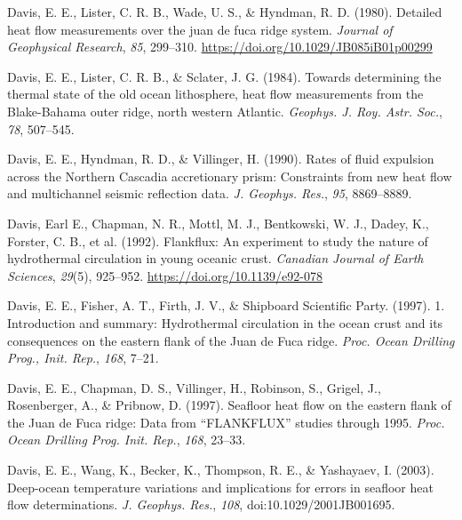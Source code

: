 \documentclass[draft,linenumbers]{agujournal2018}
\begin{document}
\leavevmode{}%
Davis, E. E., Lister, C. R. B., Wade, U. S., \& Hyndman, R. D. (1980).
Detailed heat flow measurements over the juan de fuca ridge system.
\emph{Journal of Geophysical Research}, \emph{85}, 299--310.
\url{https://doi.org/10.1029/JB085iB01p00299}

\leavevmode{}%
Davis, E. E., Lister, C. R. B., \& Sclater, J. G. (1984). Towards
determining the thermal state of the old ocean lithosphere, heat flow
measurements from the {Blake-Bahama} outer ridge, north western
{Atlantic}. \emph{Geophys. J. Roy. Astr. Soc.}, \emph{78}, 507--545.

\leavevmode{}%
Davis, E. E., Hyndman, R. D., \& Villinger, H. (1990). Rates of fluid
expulsion across the {Northern Cascadia} accretionary prism: Constraints
from new heat flow and multichannel seismic reflection data. \emph{J.
Geophys. Res.}, \emph{95}, 8869--8889.

\leavevmode{}%
Davis, Earl E., Chapman, N. R., Mottl, M. J., Bentkowski, W. J., Dadey,
K., Forster, C. B., et al. (1992). Flankflux: An experiment to study the
nature of hydrothermal circulation in young oceanic crust.
\emph{Canadian Journal of Earth Sciences}, \emph{29}(5), 925--952.
\url{https://doi.org/10.1139/e92-078}

\leavevmode{}%
Davis, E. E., Fisher, A. T., Firth, J. V., \& Shipboard Scientific
Party. (1997). 1. Introduction and summary: Hydrothermal circulation in
the ocean crust and its consequences on the eastern flank of the {Juan
de Fuca} ridge. \emph{Proc. Ocean Drilling Prog., Init. Rep.},
\emph{168}, 7--21.

\leavevmode{}%
Davis, E. E., Chapman, D. S., Villinger, H., Robinson, S., Grigel, J.,
Rosenberger, A., \& Pribnow, D. (1997). Seafloor heat flow on the
eastern flank of the {Juan de Fuca} ridge: Data from {``FLANKFLUX''}
studies through 1995. \emph{Proc. Ocean Drilling Prog. Init. Rep.},
\emph{168}, 23--33.

\leavevmode{}%
Davis, E. E., Wang, K., Becker, K., Thompson, R. E., \& Yashayaev, I.
(2003). Deep-ocean temperature variations and implications for errors in
seafloor heat flow determinations. \emph{J. Geophys. Res.}, \emph{108},
doi:10.1029/2001JB001695.
\end{document}
